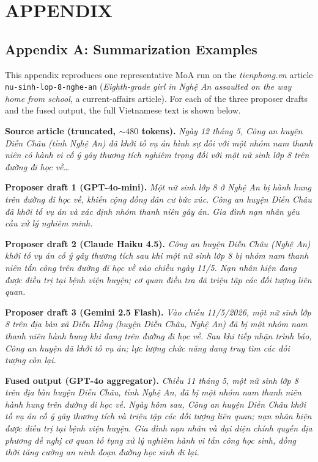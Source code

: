 \chapter*{APPENDIX}

\section*{Appendix A: Summarization Examples}

This appendix reproduces one representative MoA run on the
\textit{tienphong.vn} article \texttt{nu-sinh-lop-8-nghe-an}
(\textit{Eighth-grade girl in Nghệ An assaulted on the way home from
school}, a current-affairs article). For each of the three proposer
drafts and the fused output, the full Vietnamese text is shown below.

\textbf{Source article (truncated, $\sim 480$ tokens).}\;
\textit{Ngày 12 tháng 5, Công an huyện Diễn Châu (tỉnh Nghệ An) đã
khởi tố vụ án hình sự đối với một nhóm nam thanh niên có hành vi
cố ý gây thương tích nghiêm trọng đối với một nữ sinh lớp 8 trên
đường đi học về\dots}

\textbf{Proposer draft 1 (GPT-4o-mini).}\;
\textit{Một nữ sinh lớp 8 ở Nghệ An bị hành hung trên đường đi học về,
khiến cộng đồng dân cư bức xúc. Công an huyện Diễn Châu đã khởi tố
vụ án và xác định nhóm thanh niên gây án. Gia đình nạn nhân yêu cầu
xử lý nghiêm minh.}

\textbf{Proposer draft 2 (Claude Haiku 4.5).}\;
\textit{Công an huyện Diễn Châu (Nghệ An) khởi tố vụ án cố ý gây
thương tích sau khi một nữ sinh lớp 8 bị nhóm nam thanh niên tấn
công trên đường đi học về vào chiều ngày 11/5. Nạn nhân hiện đang
được điều trị tại bệnh viện huyện; cơ quan điều tra đã triệu tập
các đối tượng liên quan.}

\textbf{Proposer draft 3 (Gemini 2.5 Flash).}\;
\textit{Vào chiều 11/5/2026, một nữ sinh lớp 8 trên địa bàn xã Diễn Hồng
(huyện Diễn Châu, Nghệ An) đã bị một nhóm nam thanh niên hành hung
khi đang trên đường đi học về. Sau khi tiếp nhận trình báo, Công an
huyện đã khởi tố vụ án; lực lượng chức năng đang truy tìm các đối
tượng còn lại.}

\textbf{Fused output (GPT-4o aggregator).}\;
\textit{Chiều 11 tháng 5, một nữ sinh lớp 8 trên địa bàn huyện Diễn
Châu, tỉnh Nghệ An, đã bị một nhóm nam thanh niên hành hung trên
đường đi học về. Ngày hôm sau, Công an huyện Diễn Châu khởi tố vụ án
cố ý gây thương tích và triệu tập các đối tượng liên quan; nạn nhân
hiện được điều trị tại bệnh viện huyện. Gia đình nạn nhân và đại
diện chính quyền địa phương đề nghị cơ quan tố tụng xử lý nghiêm
hành vi tấn công học sinh, đồng thời tăng cường an ninh đoạn đường
học sinh đi lại.}

